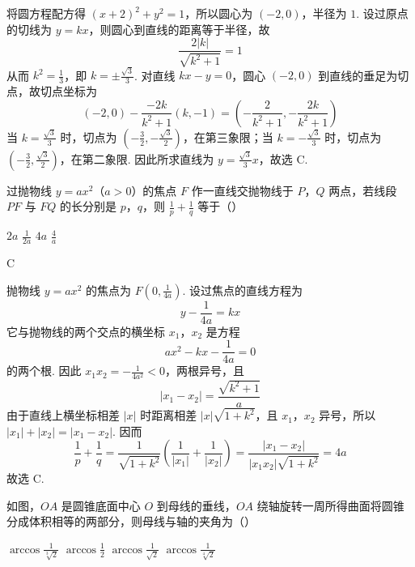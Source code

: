 \begin{solution}
将圆方程配方得 \((x+2)^2+y^2=1\)，所以圆心为 \((-2,0)\)，半径为 \(1\). 设过原点的切线为 \(y=kx\)，则圆心到直线的距离等于半径，故
\[
\frac{2|k|}{\sqrt{k^2+1}}=1
\]
从而 \(k^2=\frac13\)，即 \(k=\pm\frac{\sqrt{3}}3\). 对直线 \(kx-y=0\)，圆心 \((-2,0)\) 到直线的垂足为切点，故切点坐标为
\[
(-2,0)-\frac{-2k}{k^2+1}(k,-1)
=\left(-\frac{2}{k^2+1},-\frac{2k}{k^2+1}\right)
\]
当 \(k=\frac{\sqrt{3}}3\) 时，切点为 \(\left(-\frac32,-\frac{\sqrt{3}}2\right)\)，在第三象限；当 \(k=-\frac{\sqrt{3}}3\) 时，切点为 \(\left(-\frac32,\frac{\sqrt{3}}2\right)\)，在第二象限. 因此所求直线为 \(y=\frac{\sqrt{3}}3x\)，故选 C.
\end{solution}

\begin{problem}
过抛物线 \(y=ax^2\)（\(a>0\)）的焦点 \(F\) 作一直线交抛物线于 \(P\)，\(Q\) 两点，若线段 \(PF\) 与 \(FQ\) 的长分别是 \(p\)，\(q\)，则 \(\frac1p+\frac1q\) 等于（\quad）

\choices
    {\(2a\)}
    {\(\frac1{2a}\)}
    {\(4a\)}
    {\(\frac4a\)}
\end{problem}

\begin{answer}
C
\end{answer}

\begin{solution}
抛物线 \(y=ax^2\) 的焦点为 \(F\left(0,\frac1{4a}\right)\). 设过焦点的直线方程为
\[
y-\frac1{4a}=kx
\]
它与抛物线的两个交点的横坐标 \(x_1\)，\(x_2\) 是方程
\[
ax^2-kx-\frac1{4a}=0
\]
的两个根. 因此 \(x_1x_2=-\frac1{4a^2}<0\)，两根异号，且
\[
|x_1-x_2|=\frac{\sqrt{k^2+1}}{a}
\]
由于直线上横坐标相差 \(|x|\) 时距离相差 \(|x|\sqrt{1+k^2}\)，且 \(x_1\)，\(x_2\) 异号，所以 \(|x_1|+|x_2|=|x_1-x_2|\). 因而
\[
\frac1p+\frac1q
=\frac1{\sqrt{1+k^2}}\left(\frac1{|x_1|}+\frac1{|x_2|}\right)
=\frac{|x_1-x_2|}{|x_1x_2|\sqrt{1+k^2}}
=4a
\]
故选 C.
\end{solution}

\begin{problem}
如图，\(OA\) 是圆锥底面中心 \(O\) 到母线的垂线，\(OA\) 绕轴旋转一周所得曲面将圆锥分成体积相等的两部分，则母线与轴的夹角为（\quad）


\choices
    {\(\arccos\frac1{\sqrt[3]{2}}\)}
    {\(\arccos\frac12\)}
    {\(\arccos\frac1{\sqrt{2}}\)}
    {\(\arccos\frac1{\sqrt[4]{2}}\)}
\end{problem}

